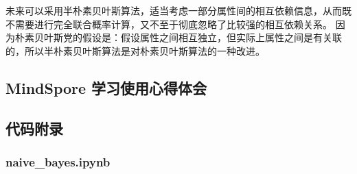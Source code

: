 \documentclass[12pt]{article}
\begin{document}
未来可以采用半朴素贝叶斯算法，适当考虑一部分属性间的相互依赖信息，从而既不需要进行完全联合概率计算，又不至于彻底忽略了比较强的相互依赖关系。
因为朴素贝叶斯党的假设是：假设属性之间相互独立，但实际上属性之间是有关联的，所以半朴素贝叶斯算法是对朴素贝叶斯算法的一种改进。


\subsection{MindSpore 学习使用心得体会}



\subsection{代码附录}
\subsubsection{naive\_bayes.ipynb}
\end{document}
